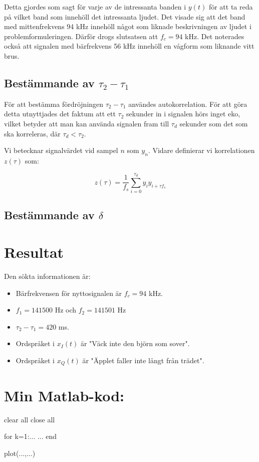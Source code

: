 \documentclass[10pt,twocolumn]{article}
\begin{document}
Detta gjordes som sagt för varje av de intressanta banden i $y(t)$ för att ta
reda på vilket band som innehöll det intressanta ljudet. Det visade sig att det
band med mittenfrekvens 94 kHz innehöll något som liknade beskrivningen av
ljudet i problemformuleringen. Därför drogs slutsatsen att $f_c = 94$ kHz.
Det noterades också att signalen med bärfrekvens 56 kHz innehöll en vågform som
liknande vitt brus.

\subsection{Bestämmande av $\tau_2 - \tau_1$}
För att bestämma fördröjningen $\tau_2 - \tau_1$ användes autokorrelation. För
att göra detta utnyttjades det faktum att ett $\tau_2$ sekunder in i signalen
hörs inget eko, vilket betyder att man kan använda signalen fram till $\tau_d$
sekunder som det som ska korreleras, där $\tau_d < \tau_2$.

Vi betecknar signalvärdet vid sampel $n$ som $y_n$. Vidare definierar vi korrelationen
$z(\tau)$ som:

\begin{equation*}
    z(\tau) = \frac{1}{f_s}\sum_{i=0}^{\tau_d}y_iy_{i + \tau f_s}
\end{equation*}

\subsection{Bestämmande av $\delta$\label{sub:delta}}

\section{Resultat}

Den sökta informationen är:
\begin{itemize}
\item Bärfrekvensen för nyttosignalen är $f_c=94$ kHz.
\item $f_1=141500$ Hz och $f_2=141501$ Hz
\item $\tau_2 - \tau_1 = 420$ ms.
\item Ordspråket i $x_I(t)$ är "Väck inte den björn som sover".
\item Ordspråket i $x_Q(t)$ är "Äpplet faller inte långt från trädet".
\end{itemize}

\clearpage

\section*{Min Matlab-kod:}
\begin{spverbatim}
clear all
close all

for k=1:...
  ...
end

plot(...,...)
\end{spverbatim}
\end{document}
